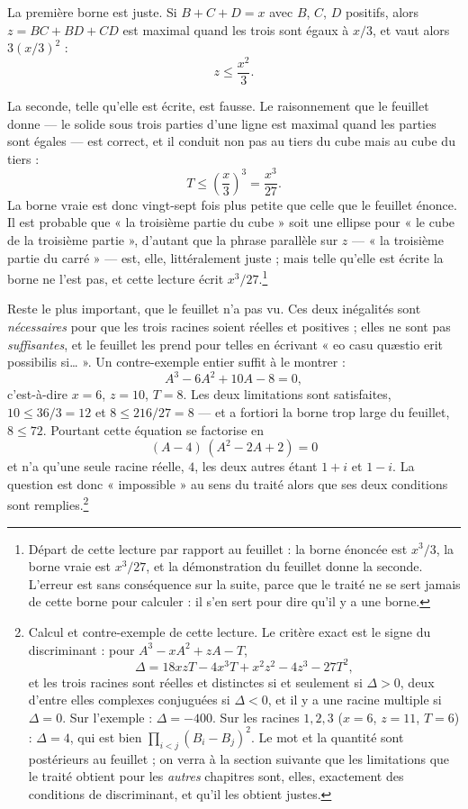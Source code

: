 \documentclass[11pt,a4paper]{article}
\begin{document}
La première borne est juste. Si $B + C + D = x$ avec $B$, $C$, $D$ positifs,
alors $z = BC + BD + CD$ est maximal quand les trois sont égaux à $x/3$, et vaut
alors $3(x/3)^2$ :
\[ z \le \frac{x^2}{3}. \]

La seconde, telle qu'elle est écrite, est fausse. Le raisonnement que le
feuillet donne — le solide sous trois parties d'une ligne est maximal quand les
parties sont égales — est correct, et il conduit non pas au tiers du cube mais
au cube du tiers :
\[ T \le \left(\frac{x}{3}\right)^3 = \frac{x^3}{27}. \]
La borne vraie est donc vingt-sept fois plus petite que celle que le feuillet
énonce. Il est probable que « la troisième partie du cube » soit une ellipse
pour « le cube de la troisième partie », d'autant que la phrase parallèle sur
$z$ — « la troisième partie du carré » — est, elle, littéralement juste ; mais
telle qu'elle est écrite la borne ne l'est pas, et cette lecture écrit
$x^3/27$.\footnote{Départ de cette lecture par rapport au feuillet : la borne
énoncée est $x^3/3$, la borne vraie est $x^3/27$, et la démonstration du
feuillet donne la seconde. L'erreur est sans conséquence sur la suite, parce que
le traité ne se sert jamais de cette borne pour calculer : il s'en sert pour
dire qu'il y a une borne.}

Reste le plus important, que le feuillet n'a pas vu. Ces deux inégalités sont
\emph{nécessaires} pour que les trois racines soient réelles et positives ;
elles ne sont pas \emph{suffisantes}, et le feuillet les prend pour telles en
écrivant « eo casu quæstio erit possibilis si… ». Un contre-exemple entier suffit
à le montrer :
\[ A^3 - 6A^2 + 10A - 8 = 0, \]
c'est-à-dire $x = 6$, $z = 10$, $T = 8$. Les deux limitations sont satisfaites,
$10 \le 36/3 = 12$ et $8 \le 216/27 = 8$ — et a fortiori la borne trop large du
feuillet, $8 \le 72$. Pourtant cette équation se factorise en
\[ (A - 4)\,(A^2 - 2A + 2) = 0 \]
et n'a qu'une seule racine réelle, $4$, les deux autres étant $1 + i$ et
$1 - i$. La question est donc « impossible » au sens du traité alors que ses
deux conditions sont remplies.\footnote{Calcul et contre-exemple de cette
lecture. Le critère exact est le signe du discriminant : pour
$A^3 - xA^2 + zA - T$,
\[ \Delta = 18xzT - 4x^3T + x^2z^2 - 4z^3 - 27T^2, \]
et les trois racines sont réelles et distinctes si et seulement si
$\Delta > 0$, deux d'entre elles complexes conjuguées si $\Delta < 0$, et il y a
une racine multiple si $\Delta = 0$. Sur l'exemple : $\Delta = -400$. Sur les
racines $1, 2, 3$ ($x=6$, $z=11$, $T=6$) : $\Delta = 4$, qui est bien
$\prod_{i<j}(B_i - B_j)^2$. Le mot et la quantité sont postérieurs au feuillet ;
on verra à la section suivante que les limitations que le traité obtient pour
les \emph{autres} chapitres sont, elles, exactement des conditions de
discriminant, et qu'il les obtient justes.}
\end{document}

